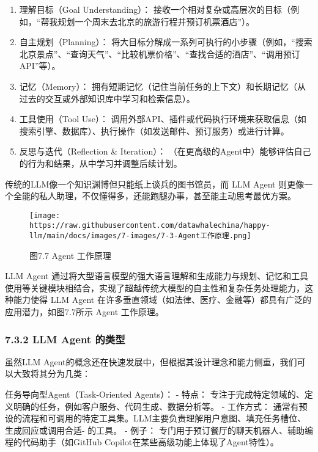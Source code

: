 \documentclass[12pt,a4paper]{book}
\begin{document}
\begin{enumerate}
\def\labelenumi{\arabic{enumi}.}
\tightlist
\item
  理解目标（Goal Understanding）：
  接收一个相对复杂或高层次的目标（例如，``帮我规划一个周末去北京的旅游行程并预订机票酒店''）。
\item
  自主规划（Planning）：
  将大目标分解成一系列可执行的小步骤（例如，``搜索北京景点''、``查询天气''、``比较机票价格''、``查找合适的酒店''、``调用预订API''等）。
\item
  记忆（Memory）：
  拥有短期记忆（记住当前任务的上下文）和长期记忆（从过去的交互或外部知识库中学习和检索信息）。
\item
  工具使用（Tool Use）：
  调用外部API、插件或代码执行环境来获取信息（如搜索引擎、数据库）、执行操作（如发送邮件、预订服务）或进行计算。
\item
  反思与迭代（Reflection \& Iteration）：
  （在更高级的Agent中）能够评估自己的行为和结果，从中学习并调整后续计划。
\end{enumerate}

传统的LLM像一个知识渊博但只能纸上谈兵的图书馆员，而 LLM Agent
则更像一个全能的私人助理，不仅懂得多，还能跑腿办事，甚至能主动思考最优方案。

\begin{figure}[htbp]\centering
\texttt{[image: https://raw.githubusercontent.com/datawhalechina/happy-llm/main/docs/images/7-images/7-3-Agent工作原理.png]}
\caption{图7.7 Agent 工作原理}
\end{figure}

LLM Agent
通过将大型语言模型的强大语言理解和生成能力与规划、记忆和工具使用等关键模块相结合，实现了超越传统大模型的自主性和复杂任务处理能力，这种能力使得
LLM Agent
在许多垂直领域（如法律、医疗、金融等）都具有广泛的应用潜力，如图7.7所示
Agent 工作原理。

\subsubsection{7.3.2 LLM Agent
的类型}\label{llm-agent-ux7684ux7c7bux578b}

虽然LLM
Agent的概念还在快速发展中，但根据其设计理念和能力侧重，我们可以大致将其分为几类：

任务导向型Agent（Task-Oriented Agents）： - 特点：
专注于完成特定领域的、定义明确的任务，例如客户服务、代码生成、数据分析等。
- 工作方式：
通常有预设的流程和可调用的特定工具集。LLM主要负责理解用户意图、填充任务槽位、生成回应或调用合适-
的工具。 - 例子：
专门用于预订餐厅的聊天机器人、辅助编程的代码助手（如GitHub
Copilot在某些高级功能上体现了Agent特性）。
\end{document}
